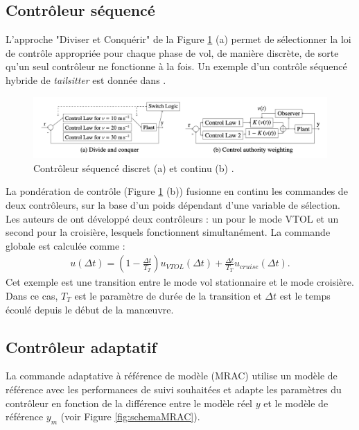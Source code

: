 \subsection*{Contrôleur séquencé}
L'approche "Diviser et Conquérir" de la Figure \ref{fig:schemaGainSche} (a) permet de sélectionner la loi de contrôle appropriée pour chaque phase de vol, de manière discrète, de sorte qu'un seul contrôleur ne fonctionne à la fois. Un exemple d'un contrôle séquencé hybride de \textit{tailsitter} est donnée dans \cite{Casau2011}.

\begin{figure}[ht!]
    \centerline{
    \includegraphics[trim=0cm 0cm 0cm 0cm,clip,width=0.9\columnwidth]{figures/gainscheduling.png}}
    \caption{Contrôleur séquencé discret (a) et continu (b) \cite{ducard_review_2021}.}
    \label{fig:schemaGainSche}
\end{figure}

La pondération de contrôle (Figure \ref{fig:schemaGainSche} (b)) fusionne en continu les commandes de deux contrôleurs, sur la base d'un poids dépendant d'une variable de sélection. Les auteurs de \cite{Liang2016} ont développé deux contrôleurs : un pour le mode VTOL et un second pour la croisière, lesquels fonctionnent simultanément. La commande globale est calculée comme  :
\begin{align*}
    u(\Delta t) = (1 - \frac{\Delta t}{T_{T}})u_{VTOL}(\Delta t) + \frac{\Delta t}{T_{T}}u_{cruise}(\Delta t).
\end{align*}
Cet exemple est une transition entre le mode vol stationnaire et le mode croisière. Dans ce cas, $T_{T}$ est le paramètre de durée de la transition et $\Delta t$ est le temps écoulé depuis le début de la manœuvre.

\subsection*{Contrôleur adaptatif}

La commande adaptative à référence de modèle (MRAC) utilise un modèle de référence avec les performances de suivi souhaitées et adapte les paramètres du contrôleur en fonction de la différence entre le modèle réel $y$ et le modèle de référence $y_{m}$ (voir Figure \ref{fig:schemaMRAC}). 

